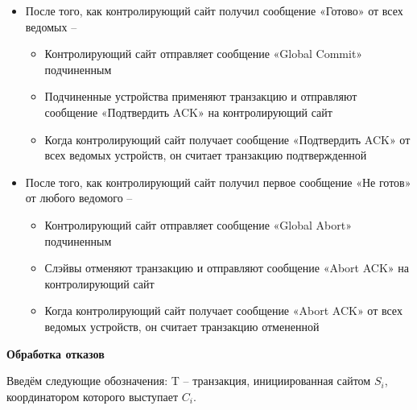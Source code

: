 \begin{itemize}
    \item После того, как контролирующий сайт получил сообщение «Готово» от всех ведомых \autocite{FixProtocols} –
    \begin{itemize}
        \item Контролирующий сайт отправляет сообщение «Global Commit» подчиненным
        \item Подчиненные устройства применяют транзакцию и отправляют сообщение «Подтвердить ACK» на контролирующий сайт
        \item Когда контролирующий сайт получает сообщение «Подтвердить ACK» от всех ведомых
        устройств, он считает транзакцию подтвержденной
    \end{itemize}
    \item После того, как контролирующий сайт получил первое сообщение «Не готов» от любого ведомого –
    \begin{itemize}
        \item Контролирующий сайт отправляет сообщение «Global Abort» подчиненным
        \item Слэйвы отменяют транзакцию и отправляют сообщение «Abort ACK» на контролирующий сайт
        \item Когда контролирующий сайт получает сообщение «Abort ACK» от всех ведомых
        устройств, он считает транзакцию отмененной
    \end{itemize}

\end{itemize}
\textbf{Обработка отказов}

Введём следующие обозначения: T -- транзакция, инициированная сайтом $S_i$, координатором которого выступает $C_i$.

